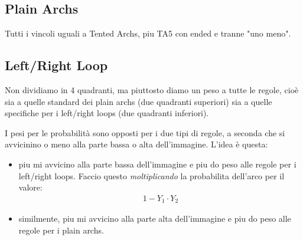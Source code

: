 \documentclass[8pt]{article}
\begin{document}
\subsection{Plain Archs}
Tutti i vincoli uguali a Tented Archs, piu TA5 con ended e tranne "uno meno".


\subsection{Left/Right Loop}
Non dividiamo in 4 quadranti, ma piuttosto diamo un peso a tutte le
regole, cioè sia a quelle standard dei plain archs (due quadranti superiori)
sia a quelle specifiche per i left/right loops (due quadranti inferiori).

I pesi per le probabilità sono opposti per i due tipi di regole, a seconda
che si avvicinino o meno alla parte bassa o alta dell'immagine. L'idea è
questa:
  \begin{itemize}
    \item
      piu mi avvicino alla parte bassa dell'immagine e piu do peso alle
      regole per i left/right loops. Faccio questo \emph{moltiplicando}
      la probabilita dell'arco per il valore:
        \begin{align*}
          1 - Y_1 \cdot Y_2
        \end{align*}
    \item
      similmente, piu mi avvicino alla parte alta dell'immagine e piu 
      do peso alle regole per i plain archs.
  \end{itemize}
\end{document}
